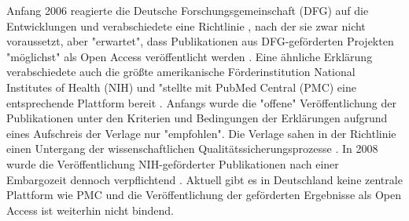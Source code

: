 Anfang 2006 reagierte die Deutsche Forschungsgemeinschaft (DFG) auf die Entwicklungen und verabschiedete eine Richtlinie \cite{DFG_oa_2006}, nach der sie zwar nicht voraussetzt, aber "erwartet", dass Publikationen aus DFG-geförderten Projekten "möglichst" als Open Access veröffentlicht werden \cite{DFG_verwendungsrichtlinien_2014}. Eine ähnliche Erklärung verabschiedete auch die größte amerikanische Förderinstitution National Institutes of Health (NIH) und "stellte mit PubMed Central (PMC) eine entsprechende Plattform bereit \cite{muller_2010_open}. Anfangs wurde die "offene" Veröffentlichung der Publikationen unter den Kriterien und Bedingungen der Erklärungen aufgrund eines Aufschreis der Verlage nur "empfohlen". Die Verlage sahen in der Richtlinie einen Untergang der wissenschaftlichen Qualitätssicherungsprozesse \cite{Baggs_2006}. In 2008 wurde die Veröffentlichung NIH-geförderter Publikationen nach einer Embargozeit dennoch verpflichtend \cite{Hanekop_2014}. Aktuell gibt es in Deutschland keine zentrale Plattform wie PMC und die Veröffentlichung der geförderten Ergebnisse als Open Access ist weiterhin nicht bindend.

